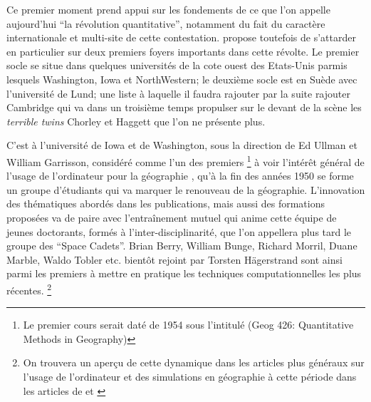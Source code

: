 Ce premier moment prend appui sur les fondements de ce que l'on appelle aujourd'hui \enquote{la révolution quantitative}, notamment du fait du caractère internationale et multi-site de cette contestation. \textcite{Gould2004} propose toutefois de s'attarder en particulier sur deux premiers foyers importants dans cette révolte. Le premier socle se situe dans quelques universités de la cote ouest des Etats-Unis \autocite{Gould2004} parmis lesquels Washington, Iowa et NorthWestern; le deuxième socle est en Suède avec l'université de Lund; une liste à laquelle il faudra rajouter par la suite rajouter Cambridge qui va dans un troisième temps propulser sur le devant de la scène les \textit{terrible twins} Chorley et Haggett que l'on ne présente plus.

C'est à l'université de Iowa et de Washington, sous la direction de Ed Ullman et William Garrisson, considéré comme l'un des premiers \footnote {Le premier cours serait daté de 1954 sous l'intitulé (Geog 426: Quantitative Methods in Geography) } à voir l'intérêt général de l'usage de l'ordinateur pour la géographie , qu'à la fin des années 1950 se forme un groupe d'étudiants qui va marquer le renouveau de la géographie. L'innovation des thématiques abordés dans les publications, mais aussi des formations proposées va de paire avec l’entraînement mutuel qui anime cette équipe de jeunes doctorants, formés à l'inter-disciplinarité, que l'on appellera plus tard le groupe des \foreignquote{english}{Space Cadets}. Brian Berry, William Bunge, Richard Morril, Duane Marble, Waldo Tobler etc. bientôt rejoint par Torsten Hägerstrand sont ainsi parmi les premiers à mettre en pratique les techniques computationnelles les plus récentes. \footnote{ On trouvera un aperçu de cette dynamique dans les articles plus généraux sur l'usage de l'ordinateur et des simulations en géographie à cette période dans les articles de \textcite{Haggett1969} et \textcite{Marble1972}}

